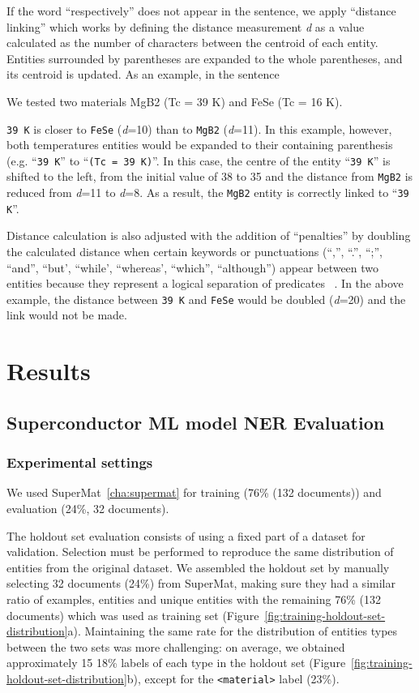 If the word ``respectively'' does not appear in the sentence, we apply ``distance linking'' which works by defining the distance measurement \textit{d} as a value calculated as the number of characters between the centroid of each entity.
Entities surrounded by parentheses are expanded to the whole parentheses, and its centroid is updated.
As an example, in the sentence
\begin{displayquote}
    We tested two materials MgB2 (Tc = 39 K) and FeSe (Tc = 16 K).
\end{displayquote}

\texttt{39 K} is closer to \texttt{FeSe} (\textit{d}=10) than to \texttt{MgB2} (\textit{d}=11). 
In this example, however, both temperatures entities would be expanded to their containing parenthesis (e.g. ``\texttt{39 K}'' to ``\texttt{(Tc = 39 K)}''. 
In this case, the centre of the entity ``\texttt{39 K}'' is shifted to the left, from the initial value of 38 to 35 and the distance from \texttt{MgB2} is reduced from \textit{d}=11 to \textit{d}=8.
As a result, the \texttt{MgB2} entity is correctly linked to ``\texttt{39 K}''.

Distance calculation is also adjusted with the addition of ``penalties'' by doubling the calculated distance when certain keywords or punctuations (``,'', ``.'', ``;'', ``and'', ``but', ``while', ``whereas', ``which'', ``although'') appear between two entities because they represent a logical separation of predicates ~\cite{oka2021table}.
In the above example, the distance between \texttt{39 K} and \texttt{FeSe} would be doubled (\textit{d}=20) and the link would not be made.

\section{Results}

\subsection{Superconductor ML model NER Evaluation}
\subsubsection{Experimental settings}

We used SuperMat~\ref{cha:supermat} for training (76\% (132 documents)) and evaluation (24\%, 32 documents). 

The holdout set evaluation consists of using a fixed part of a dataset for validation. 
Selection must be performed to reproduce the same distribution of entities from the original dataset.
We assembled the holdout set by manually selecting 32 documents (24\%) from SuperMat, making sure they had a similar ratio of examples, entities and unique entities with the remaining 76\% (132 documents) which was used as training set (Figure~\ref{fig:training-holdout-set-distribution}a).
Maintaining the same rate for the distribution of entities types between the two sets was more challenging: on average, we obtained approximately 15 18\% labels of each type in the holdout set (Figure~\ref{fig:training-holdout-set-distribution}b), except for the \texttt{<material>} label (23\%). 

